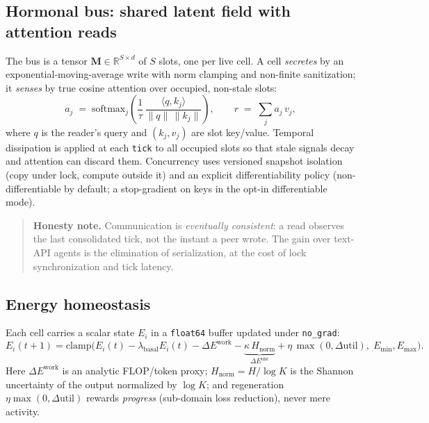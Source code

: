 \documentclass[11pt]{article}
\newcommand{\R}{\mathbb{R}}
\begin{document}
\subsection{Hormonal bus: shared latent field with attention reads}
The bus is a tensor $\mathbf{M}\in\R^{S\times d}$ of $S$ slots, one per live
cell. A cell \emph{secretes} by an exponential-moving-average write with norm
clamping and non-finite sanitization; it \emph{senses} by true cosine attention
over occupied, non-stale slots:
\begin{equation}
a_j \;=\; \mathrm{softmax}_j\!\left(\frac{1}{\tau}\,
\frac{\langle q, k_j\rangle}{\lVert q\rVert\,\lVert k_j\rVert}\right),
\qquad
r \;=\; \sum_{j} a_j\, v_j,
\label{eq:attn}
\end{equation}
where $q$ is the reader's query and $(k_j,v_j)$ are slot key/value. Temporal
dissipation is applied at each \texttt{tick} to all occupied slots so that stale
signals decay and attention can discard them. Concurrency uses versioned
snapshot isolation (copy under lock, compute outside it) and an explicit
differentiability policy (non-differentiable by default; a stop-gradient on keys
in the opt-in differentiable mode).

\begin{quotation}
\noindent\textbf{Honesty note.} Communication is \emph{eventually consistent}: a
read observes the last consolidated tick, not the instant a peer wrote. The gain
over text-API agents is the elimination of serialization, at the cost of lock
synchronization and tick latency.
\end{quotation}

\subsection{Energy homeostasis}
\label{sec:energy}
Each cell carries a scalar state $E_i$ in a \texttt{float64} buffer updated under
\texttt{no\_grad}:
\begin{equation}
E_i(t{+}1)=\mathrm{clamp}\!\Big(
E_i(t) - \lambda_{\text{basal}} E_i(t) - \Delta E^{\text{work}}
- \underbrace{\kappa\,H_{\text{norm}}}_{\Delta E^{\text{unc}}}
+ \eta\,\max(0,\Delta \mathrm{util}),\;
E_{\min}, E_{\max}\Big).
\label{eq:energy}
\end{equation}
Here $\Delta E^{\text{work}}$ is an analytic FLOP/token proxy;
$H_{\text{norm}}=H/\log K$ is the Shannon uncertainty of the output normalized
by $\log K$; and regeneration $\eta\max(0,\Delta\mathrm{util})$ rewards
\emph{progress} (sub-domain loss reduction), never mere activity.
\end{document}
